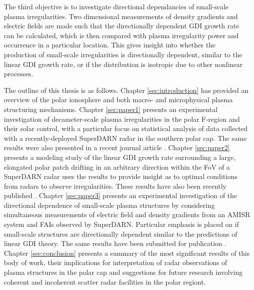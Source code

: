 The third objective is to investigate directional dependancies of small-scale plasma irregularities.  Two dimensional measurements of density gradients and electric fields are made such that the directionally dependent GDI growth rate can be calculated, which is then compared with plasma irregularity power and occurrence in a particular location.  This gives insight into whether the production of small-scale irregularities is directionally dependent, similar to the linear GDI growth rate, or if the distribution is isotropic due to other nonlinear processes.

The outline of this thesis is as follows.  Chapter \ref{sec:introduction} has provided an overview of the polar ionosphere and both macro- and microphysical plasma structuring mechanisms.  Chapter \ref{sec:paper1} presents an experimental investigation of decameter-scale plasma irregularities in the polar F-region and their solar control, with a particular focus on statistical analysis of data collected with a recently-deployed SuperDARN radar in the southern polar cap.  The same results were also presented in a recent journal article \citep{Lamarche2015}.  Chapter \ref{sec:paper2} presents a modeling study of the linear GDI growth rate surrounding a large, elongated polar patch drifting in an arbitrary direction within the FoV of a SuperDARN radar uses the results to provide insight as to optimal conditions from radars to observe irregularities.  These results have also been recently published \citep{Lamarche2016}.  Chapter \ref{sec:paper3} presents an experimental investigation of the directional dependence of small-scale plasma structures by considering simultaneous measurements of electric field and density gradients from an AMISR  system and FAIs observed by SuperDARN.  Particular emphasis is placed on if small-scale structures are directionally dependent similar to the predictions of linear GDI theory.  The same results have been submitted for publication \citep{Lamarche2017}.  Chapter \ref{sec:conclusion} presents a summary of the most significant results of this body of work, their implications for interpretation of radar observations of plasma structures in the polar cap and suggestions for future research involving coherent and incoherent scatter radar facilities in the polar regiont.




